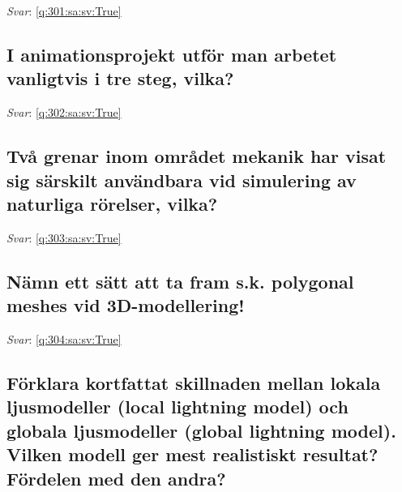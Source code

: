 \documentclass[a4paper,11pt,oneside]{article}
\begin{document}
\begin{sloppypar}
\vspace{1cm}

\textit{Svar}: \autoref{q:301:sa:sv:True}



\subsection{I animationsprojekt utf\"or man arbetet vanligtvis i tre steg, vilka?}

\label{q:302:sa:sv:False}

\vspace{2cm}

\noindent\makebox[\textwidth]{\hrulefill}

\vspace{1cm}

\textit{Svar}: \autoref{q:302:sa:sv:True}



\subsection{Tv\r{a} grenar inom omr\r{a}det mekanik har visat sig s\"arskilt anv\"andbara vid simulering av naturliga r\"orelser, vilka?}

\label{q:303:sa:sv:False}

\vspace{2cm}

\noindent\makebox[\textwidth]{\hrulefill}

\vspace{1cm}

\textit{Svar}: \autoref{q:303:sa:sv:True}



\subsection{N\"amn ett s\"att att ta fram s.k. polygonal meshes vid 3D-modellering!}

\label{q:304:sa:sv:False}

\vspace{2cm}

\noindent\makebox[\textwidth]{\hrulefill}

\vspace{1cm}

\textit{Svar}: \autoref{q:304:sa:sv:True}



\subsection{F\"orklara kortfattat skillnaden mellan lokala ljusmodeller (local lightning model) och globala ljusmodeller (global lightning model). Vilken modell ger mest realistiskt resultat? F\"ordelen med den andra?}


\end{sloppypar}
\end{document}
